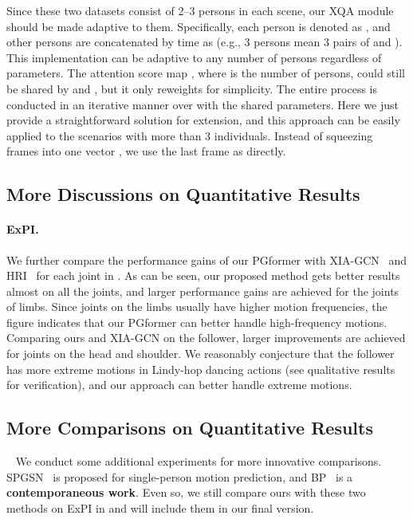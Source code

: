 \documentclass[10pt,twocolumn,letterpaper]{article}
\begin{document}
Since these two datasets consist of 2--3 persons in each scene, our XQA module should be made adaptive to them. 
Specifically, each person is denoted as , and other persons are concatenated by time as  (e.g., 3 persons mean 3 pairs of  and ). 
This implementation can be adaptive to any number of persons regardless of parameters. 
The attention score map , where  is the number of persons, could still be shared by  and , but it only reweights  for simplicity. 
The entire process is conducted in an iterative manner over  with the shared parameters. 
Here we just provide a straightforward solution for  extension, and this approach can be easily applied to the scenarios with more than 3 individuals. 
Instead of squeezing  frames  into one vector , we use the last frame  as  directly.


\subsection{More Discussions on Quantitative Results}

\paragraph{ExPI.} 
We further compare the performance gains of our PGformer with XIA-GCN~\cite{guo2021multi} and HRI~\cite{mao2020history} for each joint in . 
As can be seen, our proposed method gets better results almost on all the joints, and larger performance gains are achieved for the joints of limbs. 
Since joints on the limbs usually have higher motion frequencies, the figure indicates that our PGformer can better handle high-frequency motions.
Comparing ours and XIA-GCN on the follower, larger improvements are achieved for joints on the head and shoulder. 
We reasonably conjecture that the follower has more extreme motions in Lindy-hop dancing actions (see qualitative results for verification), and our approach can better handle extreme motions.

\subsection{More Comparisons on Quantitative Results}~\label{app_subsec:more_results}
We conduct some additional experiments for more innovative comparisons. 
SPGSN~\cite{li2022spgsn} is proposed for single-person motion prediction, and BP~\cite{rahman2023best} is a \textbf{contemporaneous work}.
Even so, we still compare ours with these two methods on ExPI in  and will include them in our final version. 
\end{document}
